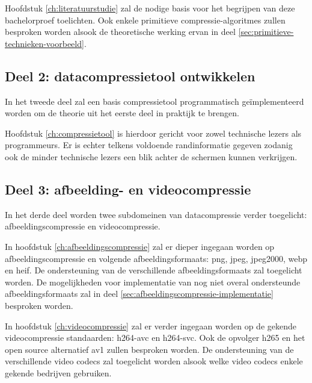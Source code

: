 Hoofdstuk \ref{ch:literatuurstudie} zal de nodige basis voor het begrijpen van deze bachelorproef toelichten. Ook enkele primitieve \glspl{compressie-algoritme} zullen besproken worden alsook de theoretische werking ervan in deel \ref{sec:primitieve-technieken-voorbeeld}.

\subsection{Deel 2: datacompressietool ontwikkelen}
\label{sec:opzet-bachelorproef-deel-2}
 
 In het tweede deel zal een basis \gls{compressietool} programmatisch geïmplementeerd worden om de theorie uit het eerste deel in praktijk te brengen.
 
Hoofdstuk \ref{ch:compressietool} is hierdoor gericht voor zowel technische lezers als programmeurs. Er is echter telkens voldoende randinformatie gegeven zodanig ook de minder technische lezers een blik achter de schermen kunnen verkrijgen.

\subsection{Deel 3: afbeelding- en videocompressie}
\label{sec:opzet-bachelorproef-deel-3}

In het derde deel worden twee subdomeinen van \gls{datacompressie} verder toegelicht: \gls{afbeeldingscompressie} en \gls{videocompressie}. 

In hoofdstuk \ref{ch:afbeeldingscompressie} zal er dieper ingegaan worden op \gls{afbeeldingscompressie} en volgende \glspl{afbeeldingsformaat}: \gls{png}, \gls{jpeg}, \gls{jpeg2000}, \gls{webp} en \gls{heif}. De ondersteuning van de verschillende \glspl{afbeeldingsformaat} zal toegelicht worden. De mogelijkheden voor implementatie van nog niet overal ondersteunde \glspl{afbeeldingsformaat} zal in deel \ref{sec:afbeeldingscompressie-implementatie} besproken worden.

In hoofdstuk \ref{ch:videocompressie} zal er verder ingegaan worden op de gekende \gls{videocompressie} standaarden: \gls{h264-avc} en \gls{h264-svc}. Ook de opvolger \gls{h265} en het open source alternatief \gls{av1} zullen besproken worden. De ondersteuning van de verschillende video \glspl{codec} zal toegelicht worden alsook welke video \glspl{codec} enkele gekende bedrijven gebruiken.

